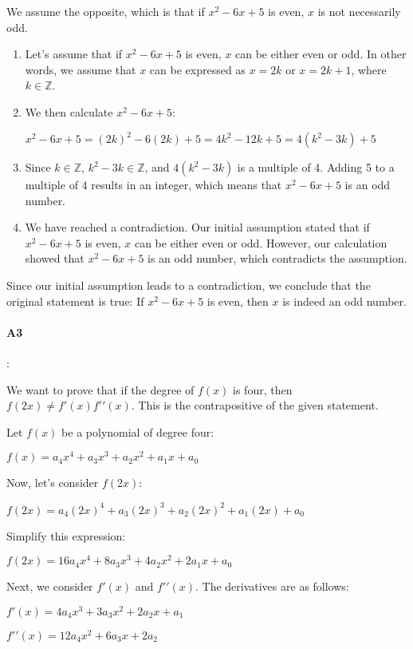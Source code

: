 \documentclass{article}
\begin{document}
We assume the opposite, which is that if $x^2 - 6x + 5$ is even, $x$ is not necessarily odd.

\begin{enumerate}
  \item Let's assume that if $x^2 - 6x + 5$ is even, $x$ can be either even or odd. In other words, we assume that $x$ can be expressed as $x = 2k$ or $x = 2k + 1$, where $k \in \mathbb{Z}$.
  \item We then calculate $x^2 - 6x + 5$:
  
$x^2 - 6x + 5 = (2k)^2 - 6(2k) + 5 = 4k^2 - 12k + 5 = 4(k^2 - 3k) + 5$
  \item Since $k \in \mathbb{Z}$, $k^2 - 3k \in \mathbb{Z}$, and $4(k^2 - 3k)$ is a multiple of 4. Adding 5 to a multiple of 4 results in an integer, which means that $x^2 - 6x + 5$ is an odd number.
  \item We have reached a contradiction. Our initial assumption stated that if $x^2 - 6x + 5$ is even, $x$ can be either even or odd. However, our calculation showed that $x^2 - 6x + 5$ is an odd number, which contradicts the assumption.
\end{enumerate}

Since our initial assumption leads to a contradiction, we conclude that the original statement is true: If $x^2 - 6x + 5$ is even, then $x$ is indeed an odd number.

\paragraph{A3}:


We want to prove that if the degree of $f(x)$ is four, then $f(2x) \neq f \prime(x)f \prime \prime(x)$. This is the contrapositive of the given statement.

Let $f(x)$ be a polynomial of degree four:

$f(x) = a_4x^4 + a_3x^3 + a_2x^2 + a_1x + a_0$

Now, let's consider $f(2x)$:

$f(2x) = a_4(2x)^4 + a_3(2x)^3 + a_2(2x)^2 + a_1(2x) + a_0$

Simplify this expression:

$f(2x) = 16a_4x^4 + 8a_3x^3 + 4a_2x^2 + 2a_1x + a_0$

Next, we consider $f\prime(x)$ and $f\prime \prime(x)$. The derivatives are as follows:

$f\prime(x) = 4a_4x^3 + 3a_3x^2 + 2a_2x + a_1$

$f\prime \prime(x) = 12a_4x^2 + 6a_3x + 2a_2$
\end{document}
